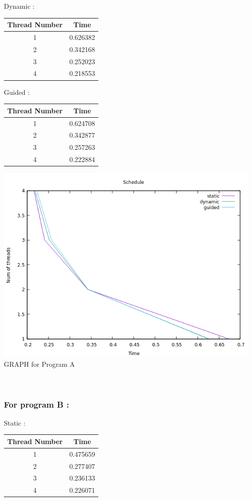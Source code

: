 \documentclass[a4paper,10pt]{article}
\begin{document}
Dynamic :
\begin{center}
\begin{tabular}{ |c|c| } 
 \hline
Thread Number & Time \\ 
 \hline 
1 & 0.626382 \\
2 & 0.342168 \\
3 & 0.252023 \\
4 & 0.218553 \\
 \hline
\end{tabular}
\end{center}
\hspace*{5mm}Guided :
\begin{center}
\begin{tabular}{ |c|c| } 
 \hline
Thread Number & Time \\ 
 \hline 
1 & 0.624708 \\
2 & 0.342877 \\
3 & 0.257263 \\
4 & 0.222884 \\
 \hline
\end{tabular}
\end{center}
\includegraphics[scale=0.7]{progADiff}\\
GRAPH for Program A
\\
\\
\\
\subsubsection{For program B :}
\hspace*{5mm} Static :
\begin{center}

\begin{tabular}{ |c|c| } 
 \hline
Thread Number & Time \\ 
 \hline 
1 & 0.475659 \\
2 & 0.277407 \\
3 & 0.236133 \\
4 & 0.226071 \\
 \hline
\end{tabular}
\end{center}
\end{document}
